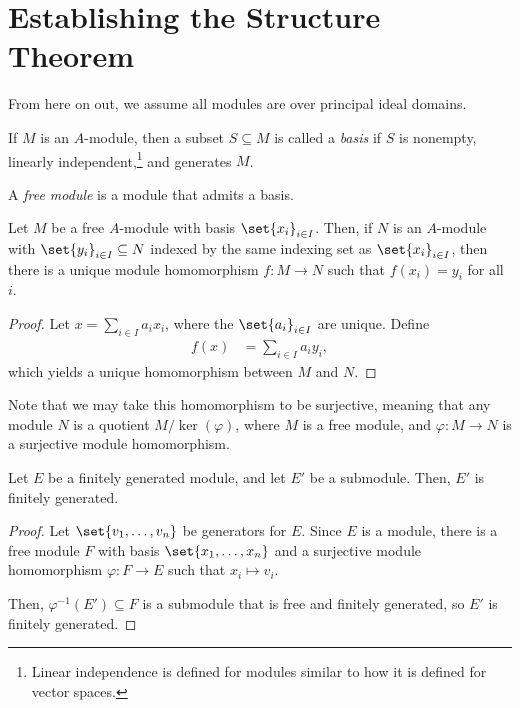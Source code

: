 \documentclass[10pt]{mypackage}
\begin{document}
\section{Establishing the Structure Theorem}%
From here on out, we assume all modules are over principal ideal domains.
\begin{definition}
  If $M$ is an $A$-module, then a subset $S\subseteq M$ is called a \textit{basis} if $S$ is nonempty, linearly independent,\footnote{Linear independence is defined for modules similar to how it is defined for vector spaces.} and generates $M$.\newline

  A \textit{free module} is a module that admits a basis.
\end{definition}
\begin{theorem}
  Let $M$ be a free $A$-module with basis $\set{x_i}_{i\in I}$. Then, if $N$ is an $A$-module with $\set{y_i}_{i\in I}\subseteq N$ indexed by the same indexing set as $\set{x_i}_{i\in I}$, then there is a unique module homomorphism $f\colon M\rightarrow N$ such that $f\left( x_i \right) = y_i$ for all $i$.
\end{theorem}
\begin{proof}
  Let $x = \sum_{i\in I}a_ix_i$, where the $\set{a_i}_{i\in I}$ are unique. Define
  \begin{align*}
    f(x) &= \sum_{i\in I}a_iy_i,
  \end{align*}
  which yields a unique homomorphism between $M$ and $N$.
\end{proof}
Note that we may take this homomorphism to be surjective, meaning that any module $N$ is a quotient $M/\ker\left( \varphi \right)$, where $M$ is a free module, and $\varphi\colon M\rightarrow N$ is a surjective module homomorphism.
\begin{corollary}
  Let $E$ be a finitely generated module, and let $E'$ be a submodule. Then, $E'$ is finitely generated.
\end{corollary}
\begin{proof}
  Let $\set{v_1,\dots,v_n}$ be generators for $E$. Since $E$ is a module, there is a free module $F$ with basis $\set{x_1,\dots,x_n}$ and a surjective module homomorphism $\varphi\colon F\rightarrow E$ such that $x_i\mapsto v_i$.\newline

  Then, $\varphi^{-1}\left( E' \right)\subseteq F$ is a submodule that is free and finitely generated, so $E'$ is finitely generated.
\end{proof}
\end{document}
